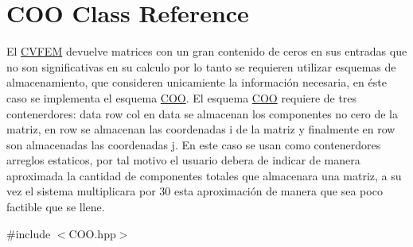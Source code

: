 \hypertarget{class_c_o_o}{}\section{C\+OO Class Reference}
\label{class_c_o_o}


El \hyperlink{class_c_v_f_e_m}{C\+V\+F\+EM} devuelve matrices con un gran contenido de ceros en sus entradas que no son significativas en su calculo por lo tanto se requieren utilizar esquemas de almacenamiento, que consideren unicamiente la información necesaria, en éste caso se implementa el esquema \hyperlink{class_c_o_o}{C\+OO}. El esquema \hyperlink{class_c_o_o}{C\+OO} requiere de tres contenerdores\+: data row col en data se almacenan los componentes no cero de la matriz, en row se almacenan las coordenadas i de la matriz y finalmente en row son almacenadas las coordenadas j. En este caso se usan como contenerdores arreglos estaticos, por tal motivo el usuario debera de indicar de manera aproximada la cantidad de componentes totales que almacenara una matriz, a su vez el sistema multiplicara por 30 esta aproximación de manera que sea poco factible que se llene.  




{\ttfamily \#include $<$C\+O\+O.\+hpp$>$}

